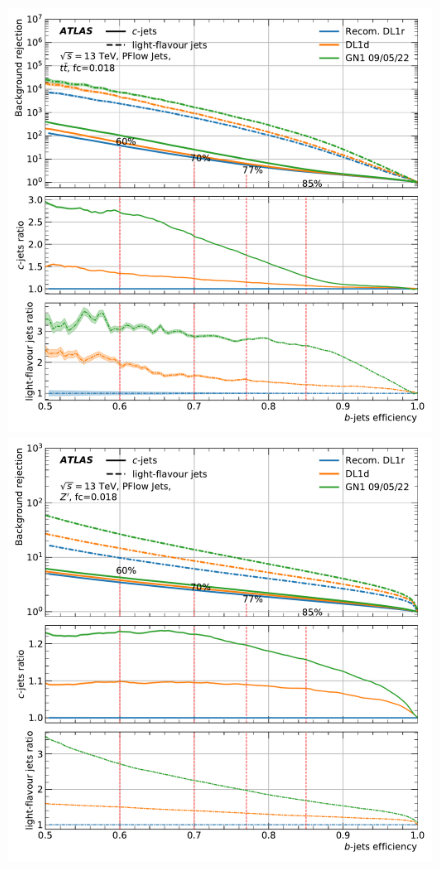 %
\begin{center}
\vspace{-1.cm}
\begin{figure}[h!]
\centerline{
\includegraphics[scale=0.45]{Images//FTAG/Reprocessed/plotting_alone/ttbar_comparisons_300.pdf}
\includegraphics[scale=0.45]{Images//FTAG/Reprocessed/plotting_alone/zp_comparisons_300.pdf}
}
\end{figure}
\end{center}
